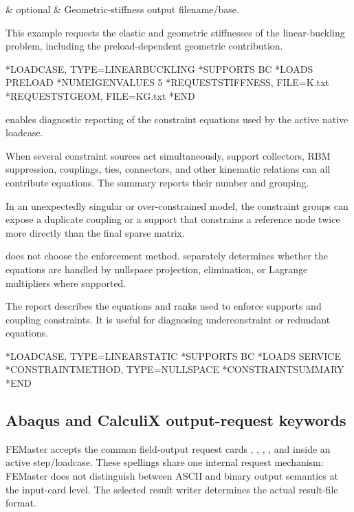 \begin{keywordparameters}
 & optional & Geometric-stiffness output filename/base. \\
\end{keywordparameters}

This example requests the elastic and geometric stiffnesses of the linear-buckling problem, including the preload-dependent geometric contribution.

\exampleheading
\begin{inputdeck}
*LOADCASE, TYPE=LINEARBUCKLING
*SUPPORTS
BC
*LOADS
PRELOAD
*NUMEIGENVALUES
5
*REQUESTSTIFFNESS, FILE=K.txt
*REQUESTSTGEOM, FILE=KG.txt
*END
\end{inputdeck}


 enables diagnostic reporting of the constraint equations used by the active native loadcase.

When several constraint sources act simultaneously, support collectors, RBM suppression, couplings, ties, connectors, and other kinematic relations can all contribute equations. The summary reports their number and grouping.

In an unexpectedly singular or over-constrained model, the constraint groups can expose a duplicate coupling or a support that constrains a reference node twice more directly than the final sparse matrix.

 does not choose the enforcement method.  separately determines whether the equations are handled by nullspace projection, elimination, or Lagrange multipliers where supported.

The report describes the equations and ranks used to enforce supports and coupling constraints. It is useful for diagnosing underconstraint or redundant equations.

\exampleheading
\begin{inputdeck}
*LOADCASE, TYPE=LINEARSTATIC
*SUPPORTS
BC
*LOADS
SERVICE
*CONSTRAINTMETHOD, TYPE=NULLSPACE
*CONSTRAINTSUMMARY
*END
\end{inputdeck}

\subsection{Abaqus and CalculiX output-request keywords}

FEMaster accepts the common field-output request cards , , , , and  inside an active step/loadcase. These spellings share one internal request mechanism: FEMaster does not distinguish between ASCII and binary output semantics at the input-card level. The selected result writer determines the actual result-file format.

